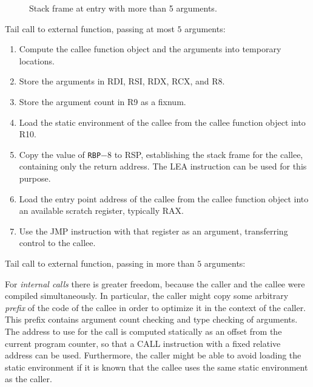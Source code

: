 \begin{figure}
\begin{center}
\end{center}
\caption{\label{fig-x86-64-stack-frame-at-entry}
Stack frame at entry with more than 5 arguments.}
\end{figure}

Tail call to external function, passing at most $5$ arguments:

\begin{enumerate}
\item Compute the callee function object and the arguments into
  temporary locations.
\item Store the arguments in RDI, RSI, RDX, RCX, and R8.
\item Store the argument count in R9 as a fixnum.
\item Load the static environment of the callee from the callee
  function object into R10.
\item Copy the value of \texttt{RBP}$ - 8$ to RSP, establishing the stack frame
  for the callee, containing only the return address.  The LEA
  instruction can be used for this purpose.
\item Load the entry point address of the callee from the callee
  function object into an available scratch register, typically RAX.
\item Use the JMP instruction with that register as an argument,
  transferring control to the callee.
\end{enumerate}

Tail call to external function, passing in more than $5$ arguments:%

For \emph{internal calls} there is greater freedom, because the caller
and the callee were compiled simultaneously.  In particular, the
caller might copy some arbitrary \emph{prefix} of the code of the
callee in order to optimize it in the context of the caller.  This
prefix contains argument count checking and type checking of
arguments.  The address to use for the call is computed statically as
an offset from the current program counter, so that a CALL instruction
with a fixed relative address can be used.  Furthermore, the caller
might be able to avoid loading the static environment if it is known
that the callee uses the same static environment as the caller.

